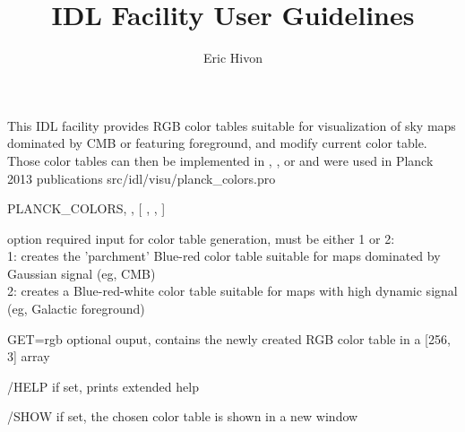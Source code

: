 
\sloppy

\title{\healpix IDL Facility User Guidelines}
 \section[planck\_colors]{ }
\label{idl:planck_colors}
\author{Eric Hivon}

\begin{facility}
{This IDL facility provides RGB color tables suitable for visualization of
sky maps dominated by CMB or featuring foreground, and modify current color
table. 
Those color tables can then be implemented in 
,
,
 or
 and were used in Planck 2013 publications%
}
{src/idl/visu/planck\_colors.pro}
\end{facility}

\begin{IDLformat}
{PLANCK\_COLORS, 
, [%
,
,
]}
\end{IDLformat}

\begin{qualifiers}
  \begin{qulist}{} %
   \item[option]  required input for color
table generation, must be either 1 or 2: \\
1: creates the 'parchment' Blue-red color table suitable for  maps
         dominated by Gaussian signal (eg, CMB)\\
2: creates a Blue-red-white color table suitable for maps with 
         high dynamic signal (eg, Galactic foreground)
  \end{qulist}
\end{qualifiers}

\begin{keywords}
  \begin{kwlist}{} %
 \item[GET=rgb]  optional ouput, contains the newly created RGB color table
     in a [256, 3] array

 \item[/HELP]       if set, prints extended help

 \item[/SHOW]       if set, the chosen color
table is shown in a new window

  \end{kwlist}
\end{keywords}  

